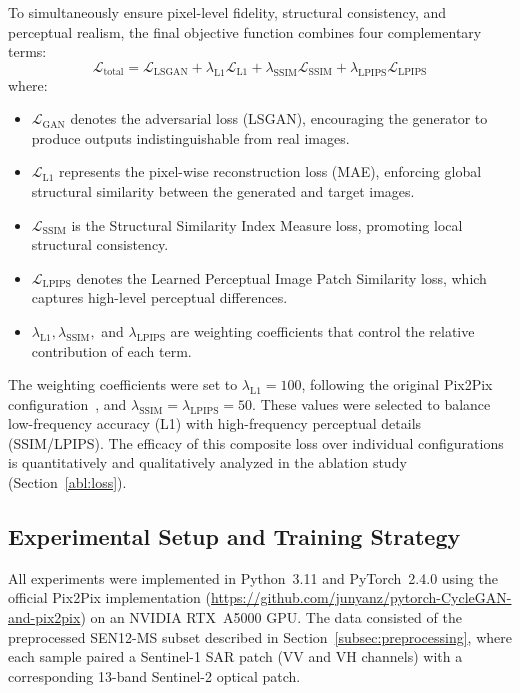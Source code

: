 To simultaneously ensure pixel-level fidelity, structural consistency, and perceptual realism, the final objective function combines four complementary terms:
\begin{equation}
    \mathcal{L}_{\text{total}} = \mathcal{L}_{\text{LSGAN}} + \lambda_{\text{L1}} \mathcal{L}_{\text{L1}} + \lambda_{\text{SSIM}} \mathcal{L}_{\text{SSIM}} + \lambda_{\text{LPIPS}} \mathcal{L}_{\text{LPIPS}}
\end{equation}
where:
\begin{itemize}
    \item $\mathcal{L}_{\text{GAN}}$ denotes the adversarial loss (LSGAN), encouraging the generator to produce outputs indistinguishable from real images. 
    \item $\mathcal{L}_{\text{L1}}$ represents the pixel-wise reconstruction loss (MAE), enforcing global structural similarity between the generated and target images.
    \item $\mathcal{L}_{\text{SSIM}}$ is the Structural Similarity Index Measure loss, promoting local structural consistency.
    \item $\mathcal{L}_{\text{LPIPS}}$ denotes the Learned Perceptual Image Patch Similarity loss, which captures high-level perceptual differences.
    \item $\lambda_{\text{L1}}, \lambda_{\text{SSIM}},$ and $\lambda_{\text{LPIPS}}$ are weighting coefficients that control the relative contribution of each term.
\end{itemize}

The weighting coefficients were set to $\lambda_{\text{L1}} = 100$, following the original Pix2Pix configuration~\cite{pix2pix_2018}, and $\lambda_{\text{SSIM}} = \lambda_{\text{LPIPS}} = 50$. These values were selected to balance low-frequency accuracy (L1) with high-frequency perceptual details (SSIM/LPIPS). The efficacy of this composite loss over individual configurations is quantitatively and qualitatively analyzed in the ablation study (Section~\ref{abl:loss}).

\subsection{Experimental Setup and Training Strategy}
\label{sec:experimental_setup}

All experiments were implemented in Python~3.11 and PyTorch~2.4.0 using the official Pix2Pix implementation (\url{https://github.com/junyanz/pytorch-CycleGAN-and-pix2pix}) on an NVIDIA RTX~A5000 GPU. The data consisted of the preprocessed SEN12-MS subset described in Section~\ref{subsec:preprocessing}, where each sample paired a Sentinel-1 SAR patch (VV and VH channels) with a corresponding 13-band Sentinel-2 optical patch.

